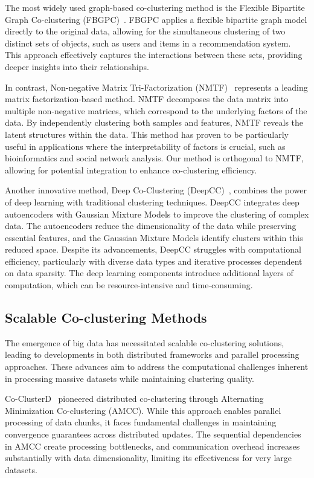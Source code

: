 \documentclass[journal]{IEEEtran}
\renewcommand{\cite}[1]{~\autocite{#1}}
\begin{document}
The most widely used graph-based co-clustering method is the Flexible Bipartite Graph Co-clustering (FBGPC)\cite{chen2023FastFlexibleBipartitea}. FBGPC applies a flexible bipartite graph model directly to the original data, allowing for the simultaneous clustering of two distinct sets of objects, such as users and items in a recommendation system. This approach effectively captures the interactions between these sets, providing deeper insights into their relationships.

In contrast, Non-negative Matrix Tri-Factorization (NMTF)\cite{long2005CoclusteringBlockValue} represents a leading matrix factorization-based method. NMTF decomposes the data matrix into multiple non-negative matrices, which correspond to the underlying factors of the data. By independently clustering both samples and features, NMTF reveals the latent structures within the data. This method has proven to be particularly useful in applications where the interpretability of factors is crucial, such as bioinformatics and social network analysis. Our method is orthogonal to NMTF, allowing for potential integration to enhance co-clustering efficiency.

Another innovative method, Deep Co-Clustering (DeepCC)\cite{dongkuanxu2019DeepCoClustering}, combines the power of deep learning with traditional clustering techniques. DeepCC integrates deep autoencoders with Gaussian Mixture Models to improve the clustering of complex data. The autoencoders reduce the dimensionality of the data while preserving essential features, and the Gaussian Mixture Models identify clusters within this reduced space. Despite its advancements, DeepCC struggles with computational efficiency, particularly with diverse data types and iterative processes dependent on data sparsity. The deep learning components introduce additional layers of computation, which can be resource-intensive and time-consuming.

\subsection{Scalable Co-clustering Methods}
The emergence of big data has necessitated scalable co-clustering solutions, leading to developments in both distributed frameworks and parallel processing approaches. These advances aim to address the computational challenges inherent in processing massive datasets while maintaining clustering quality.

Co-ClusterD\cite{cheng2015CoClusterDDistributedFramework} pioneered distributed co-clustering through Alternating Minimization Co-clustering (AMCC). While this approach enables parallel processing of data chunks, it faces fundamental challenges in maintaining convergence guarantees across distributed updates. The sequential dependencies in AMCC create processing bottlenecks, and communication overhead increases substantially with data dimensionality, limiting its effectiveness for very large datasets.
\end{document}
